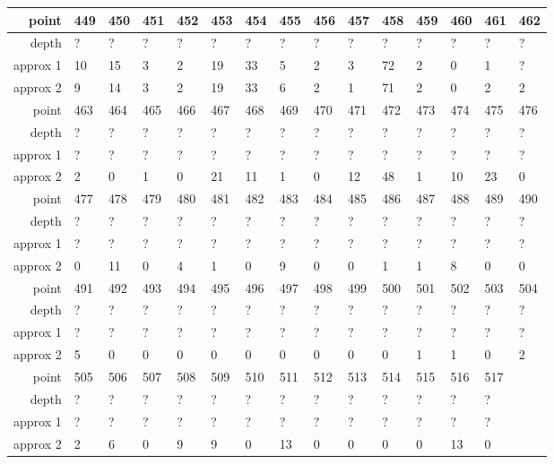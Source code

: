 \begin{center}
\begin{supertabular}{|r|l l l l l l l l l l l l l l|}
\hline
point & 449 & 450 & 451 & 452 & 453 & 454 & 455 & 456 & 457 & 458 & 459 & 460 & 461 & 462 \\
\hline
depth & ? & ? & ? & ? & ? & ? & ? & ? & ? & ? & ? & ? & ? & ? \\
approx 1 & 10 & 15 & 3 & 2 & 19 & 33 & 5 & 2 & 3 & 72 & 2 & 0 & 1 & ? \\
approx 2 & 9 & 14 & 3 & 2 & 19 & 33 & 6 & 2 & 1 & 71 & 2 & 0 & 2 & 2 \\
\hline
point & 463 & 464 & 465 & 466 & 467 & 468 & 469 & 470 & 471 & 472 & 473 & 474 & 475 & 476 \\
\hline
depth & ? & ? & ? & ? & ? & ? & ? & ? & ? & ? & ? & ? & ? & ? \\
approx 1 & ? & ? & ? & ? & ? & ? & ? & ? & ? & ? & ? & ? & ? & ? \\
approx 2 & 2 & 0 & 1 & 0 & 21 & 11 & 1 & 0 & 12 & 48 & 1 & 10 & 23 & 0 \\
\hline
point & 477 & 478 & 479 & 480 & 481 & 482 & 483 & 484 & 485 & 486 & 487 & 488 & 489 & 490 \\
\hline
depth & ? & ? & ? & ? & ? & ? & ? & ? & ? & ? & ? & ? & ? & ? \\
approx 1 & ? & ? & ? & ? & ? & ? & ? & ? & ? & ? & ? & ? & ? & ? \\
approx 2 & 0 & 11 & 0 & 4 & 1 & 0 & 9 & 0 & 0 & 1 & 1 & 8 & 0 & 0 \\
\hline
point & 491 & 492 & 493 & 494 & 495 & 496 & 497 & 498 & 499 & 500 & 501 & 502 & 503 & 504 \\
\hline
depth & ? & ? & ? & ? & ? & ? & ? & ? & ? & ? & ? & ? & ? & ? \\
approx 1 & ? & ? & ? & ? & ? & ? & ? & ? & ? & ? & ? & ? & ? & ? \\
approx 2 & 5 & 0 & 0 & 0 & 0 & 0 & 0 & 0 & 0 & 0 & 1 & 1 & 0 & 2 \\
\hline
point & 505 & 506 & 507 & 508 & 509 & 510 & 511 & 512 & 513 & 514 & 515 & 516 & 517 & \\
\hline
depth & ? & ? & ? & ? & ? & ? & ? & ? & ? & ? & ? & ? & ? & \\
approx 1 & ? & ? & ? & ? & ? & ? & ? & ? & ? & ? & ? & ? & ? & \\
approx 2 & 2 & 6 & 0 & 9 & 9 & 0 & 13 & 0 & 0 & 0 & 0 & 13 & 0 & \\
\hline
  \end{supertabular}
  \label{tab:test.forest5d}
\end{center}

